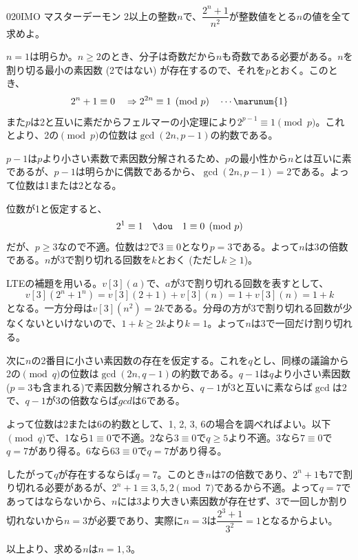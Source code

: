\begin{prob}{020}{}{IMO マスターデーモン}
 2以上の整数$n$で、$\dfrac{2^n+1}{n^2}$が整数値をとる$n$の値を全て求めよ。 \\
\end{prob}

$n=1$は明らか。$n\ge 2$のとき、分子は奇数だから$n$も奇数である必要がある。$n$を割り切る最小の素因数 (2ではない) が存在するので、それを$p$とおく。このとき、
\[ 2^n+1\equiv 0 \quad\Rightarrow 2^{2n}\equiv 1 \pmod{p} \quad \cdots \marunum{1} \]
また$p$は2と互いに素だからフェルマーの小定理により$2^{p-1}\equiv 1 \pmod{p}$。これとより、2の$\pmod{p}$の位数は$\gcd(2n, p-1)$の約数である。

$p-1$は$p$より小さい素数で素因数分解されるため、$p$の最小性から$n$とは互いに素であるが、$p-1$は明らかに偶数であるから、$\gcd(2n, p-1)=2$である。よって位数は1または2となる。

位数が1と仮定すると、
\[ 2^1\equiv 1 \quad\dou\quad 1\equiv 0 \pmod{p} \]
だが、$p\ge 3$なので不適。位数は2で$3\equiv 0$となり$p=3$である。よって$n$は3の倍数である。$n$が3で割り切れる回数を$k$とおく (ただし$k\ge 1$)。

LTEの補題を用いる。$v[3](a)$で、$a$が3で割り切れる回数を表すとして、
\[ v[3](2^n+1^n)=v[3](2+1)+v[3](n)=1+v[3](n)=1+k \]
となる。一方分母は$v[3](n^2)=2k$である。分母の方が3で割り切れる回数が少なくないといけないので、$1+k\ge 2k$より$k=1$。よって$n$は3で一回だけ割り切れる。

次に$n$の2番目に小さい素因数の存在を仮定する。これを$q$とし、同様の議論から2の$\pmod{q}$の位数は$\gcd(2n, q-1)$の約数である。$q-1$は$q$より小さい素因数($p=3$も含まれる)で素因数分解されるから、$q-1$が3と互いに素ならば$\gcd$は2で、$q-1$が3の倍数ならば$gcd$は6である。

よって位数は2または6の約数として、1, 2, 3, 6の場合を調べればよい。以下$\pmod{q}$で、1なら$1\equiv 0$で不適。2なら$3\equiv 0$で$q\ge 5$より不適。3なら$7\equiv 0$で$q=7$があり得る。6なら$63\equiv 0$で$q=7$があり得る。

したがって$q$が存在するならば$q=7$。このとき$n$は7の倍数であり、$2^n+1$も7で割り切れる必要があるが、$2^n+1\equiv 3, 5, 2 \pmod{7}$であるから不適。よって$q=7$であってはならないから、$n$には3より大きい素因数が存在せず、3で一回しか割り切れないから$n=3$が必要であり、実際に$n=3$は$\dfrac{2^3+1}{3^2}=1$となるからよい。

以上より、求める$n$は$n=1, 3$。